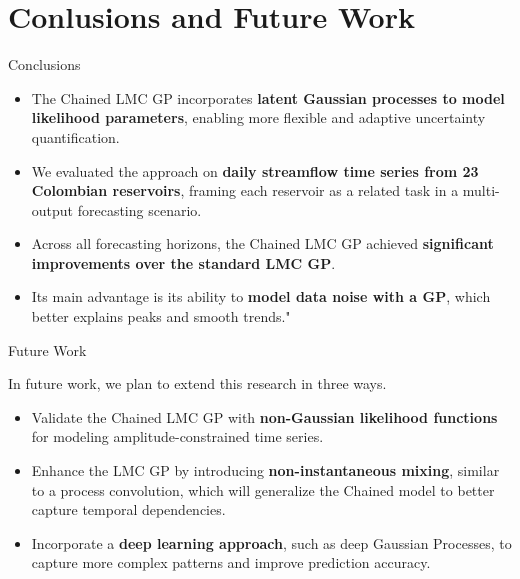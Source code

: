 \section{Conlusions and Future Work}

\begin{frame}{Conclusions}
	
	\begin{block}{}
	\begin{itemize}
		\item The Chained LMC GP incorporates \textcolor{BrandTeal}{\textbf{latent Gaussian processes to model likelihood parameters}}, enabling more flexible and adaptive uncertainty quantification. 
		\item We evaluated the approach on \textcolor{BrandTeal}{\textbf{daily streamflow time series from 23 Colombian reservoirs}}, framing each reservoir as a related task in a multi-output forecasting scenario.  
		\item Across all forecasting horizons, the Chained LMC GP achieved \textcolor{BrandTeal}{\textbf{significant improvements over the standard LMC GP}}. 
		\item Its main advantage is its ability to \textcolor{BrandTeal}{\textbf{model data noise with a GP}}, which better explains peaks and smooth trends." 
	\end{itemize}
	\end{block}
\end{frame}

\begin{frame}{Future Work}
	\begin{block}{}
		In future work, we plan to extend this research in three ways.
		
		\begin{itemize}
			 \item Validate the Chained LMC GP with \textcolor{BrandTeal}{\textbf{non-Gaussian likelihood functions}} for modeling amplitude-constrained time series. 
			 \item Enhance the LMC GP by introducing \textcolor{BrandTeal}{\textbf{non-instantaneous mixing}}, similar to a process convolution, which will generalize the Chained model to better capture temporal dependencies.
			 \item Incorporate a \textcolor{BrandTeal}{\textbf{deep learning approach}}, such as deep Gaussian Processes, to capture more complex patterns and improve prediction accuracy.
		\end{itemize} 
	\end{block}
\end{frame}


